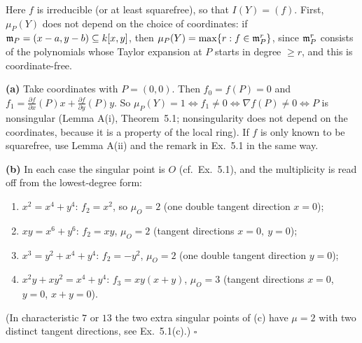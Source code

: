 \documentclass[11pt]{article}
\begin{document}
\pf
Here $f$ is irreducible (or at least squarefree), so that $I(Y)=(f)$. First, $\mu_P(Y)$ does not depend on the choice of coordinates: if $\mathfrak m_P=(x-a,y-b)\subseteq k[x,y]$, then $\mu_P(Y)=\max\{r: f\in\mathfrak m_P^r\}$, since $\mathfrak m_P^r$ consists of the polynomials whose Taylor expansion at $P$ starts in degree $\ge r$, and this is coordinate-free.

\textbf{(a)} Take coordinates with $P=(0,0)$. Then $f_0=f(P)=0$ and $f_1=\frac{\partial f}{\partial x}(P)x+\frac{\partial f}{\partial y}(P)y$. So $\mu_P(Y)=1\iff f_1\ne0\iff\nabla f(P)\neq 0\iff P$ is nonsingular (Lemma A(i), Theorem~5.1; nonsingularity does not depend on the coordinates, because it is a property of the local ring). If $f$ is only known to be squarefree, use Lemma A(ii) and the remark in Ex.~5.1 in the same way.

\textbf{(b)} In each case the singular point is $O$ (cf.\ Ex.~5.1), and the multiplicity is read off from the lowest-degree form:
\begin{enumerate}[label=(\alph*),leftmargin=*]
\item $x^2=x^4+y^4$: $f_2=x^2$, so $\mu_O=2$ (one double tangent direction $x=0$);
\item $xy=x^6+y^6$: $f_2=xy$, $\mu_O=2$ (tangent directions $x=0,\ y=0$);
\item $x^3=y^2+x^4+y^4$: $f_2=-y^2$, $\mu_O=2$ (one double tangent direction $y=0$);
\item $x^2y+xy^2=x^4+y^4$: $f_3=xy(x+y)$, $\mu_O=3$ (tangent directions $x=0$, $y=0$, $x+y=0$).
\end{enumerate}
(In characteristic $7$ or $13$ the two extra singular points of (c) have $\mu=2$ with two distinct tangent directions, see Ex.~5.1(c).) \hfill$\square$
\end{document}
